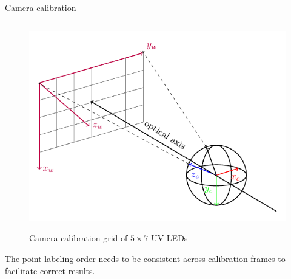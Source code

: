 \documentclass{beamer}
\begin{document}
\begin{frame}{Camera calibration}
\begin{columns}[T]
    \begin{column}{0.48\textwidth}
        \vspace{-0.3cm}
        \begin{figure}[H]
            \centering
            \includegraphics[width=\textwidth]{../fig/tikz/extrinsic.pdf}
            \label{fig:extrinsic_img}
            \caption{Camera calibration grid of $5\times7$ UV LEDs}
        \end{figure}
        
        \tiny{
            The point labeling order needs to be consistent across calibration frames to facilitate correct results.
        }
    \end{column}
\end{columns}
    
\end{frame}

   
    
\end{document}
